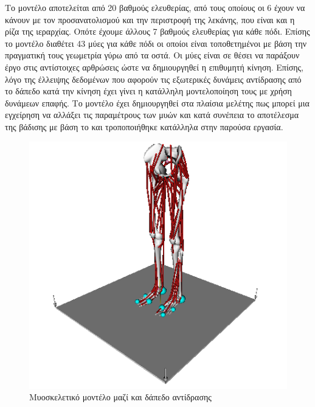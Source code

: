 Το μοντέλο αποτελείται από 20 βαθμούς ελευθερίας, από τους οποίους οι 6 έχουν να κάνουν με τον προσανατολισμού και την περιστροφή της λεκάνης, που είναι και η ρίζα της ιεραρχίας. Οπότε έχουμε άλλους 7 βαθμούς ελευθερίας για κάθε πόδι. Επίσης το μοντέλο διαθέτει 43 μύες για κάθε πόδι οι οποίοι είναι τοποθετημένοι με βάση την πραγματική τους γεωμετρία γύρω από τα οστά. Οι μύες είναι σε θέσει να παράξουν έργο στις αντίστοιχες αρθρώσεις ώστε να δημιουργηθεί η επιθυμητή κίνηση. Επίσης, λόγο της έλλειψης δεδομένων που αφορούν τις εξωτερικές δυνάμεις αντίδρασης από το δάπεδο κατά την κίνηση έχει γίνει η κατάλληλη μοντελοποίηση τους με χρήση δυνάμεων επαφής. Το μοντέλο έχει δημιουργηθεί στα πλαίσια μελέτης πως μπορεί μια εγχείρηση να αλλάξει τις παραμέτρους των μυών και κατά συνέπεια το αποτέλεσμα της βάδισης με βάση το \cite{delp90} και τροποποιήθηκε κατάλληλα στην παρούσα εργασία.

\begin{figure}[H]
    \centering
    \includegraphics[height=0.38\textheight]{methods/fig/lower-limb-model.png}
    \caption{Μυοσκελετικό μοντέλο μαζί και δάπεδο αντίδρασης}
    \label{fig:lower-limb-model}
\end{figure}

